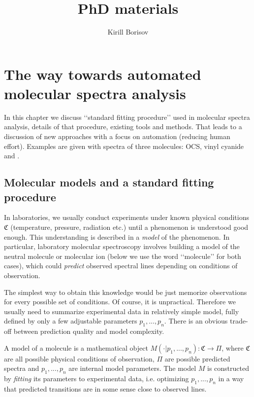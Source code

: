 \documentclass[11pt]{article}
\title{PhD materials}
\author{Kirill Borisov}
\begin{document}
\begin{titlepage}
\maketitle
\end{titlepage}

\tableofcontents
\newpage




\section{The way towards automated molecular spectra analysis}

In this chapter we discuss \lq\lq{}standard fitting procedure\rq\rq{} used in molecular spectra analysis, details of that procedure, existing tools and methods. That leads to a discussion of new approaches with a focus on automation (reducing human effort). Examples are given with spectra of three molecules: OCS, vinyl cyanide and . 

\subsection{Molecular models and a standard fitting procedure}

In laboratories, we usually conduct experiments under known physical conditions $\mathfrak{C}$ (temperature, pressure, radiation etc.) until a phenomenon is understood good enough. This understanding is described in a \emph{model} of the phenomenon. In particular, laboratory molecular spectroscopy involves building a model of the neutral molecule or molecular ion (below we use the word \lq\lq{}molecule\rq\rq{} for both cases), which could \emph{predict} observed spectral lines depending on conditions of observation. 

The simplest way to obtain this knowledge would be just memorize observations for every possible set of conditions. Of course, it is unpractical. Therefore we usually need to summarize experimental data in relatively simple model, fully defined by only a few adjustable parameters $p_1, ..., p_n$. There is an obvious trade-off between prediction quality and model complexity.

A model of a molecule is a mathematical object $M(\cdot | p_1, ..., p_n): \mathfrak{C} \rightarrow \Pi$, where $\mathfrak{C}$ are all possible physical conditions of observation, $\Pi$ are possible predicted spectra and $p_1, ..., p_n$ are internal model parameters. The model $M$ is constructed by \emph{fitting} its parameters to experimental data, i.e. optimizing  $p_1, ..., p_n$ in a way that predicted transitions are in some sense close to observed lines.  
\end{document}
